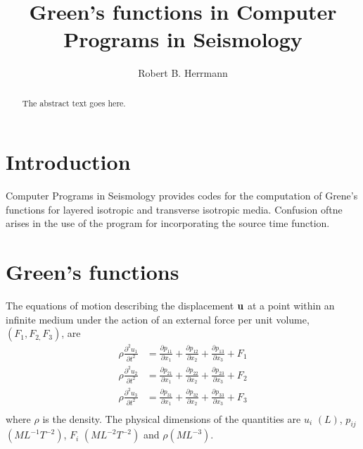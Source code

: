 \documentclass{article}
\begin{document}
\title{Green's functions in Computer Programs in Seismology
{}}
\author{Robert B. Herrmann}

\maketitle

\begin{abstract}

The abstract text goes here.
\end{abstract}

\section{Introduction}

Computer Programs in Seismology provides codes for the computation of Grene's functions for layered isotropic and transverse isotropic media.
Confusion oftne arises in the use of the program for incorporating the source time function.

\section{Green's functions}


The equations of motion describing the displacement $ {\bf u} $ at a point within an infinite medium under the action of
an external force per unit
volume, $( F_1 , F_{2,} F_3 ) $, 
are
\begin{equation} \label{eq5_2_1}
\begin{aligned}
 \rho \frac{ \partial^2 { u_1 }  }{  \partial t^2 } &= 
{ \frac{ \partial { p_{11} }  }{  \partial x_1 } } +
{ \frac{ \partial { p_{12} }  }{  \partial x_2 } }+
{ \frac{ \partial { p_{13} }  }{  \partial x_3 } }+
{ F_1 } \\
 \rho \frac{ \partial^2 { u_2 }  }{  \partial t^2 } &=
{ \frac{ \partial { p_{21} }  }{  \partial x_1 } } +
{ \frac{ \partial { p_{22} }  }{  \partial x_2 } }+
{ \frac{ \partial { p_{23} }  }{  \partial x_3 } }+
{ F_2 } \\
 \rho \frac{ \partial^2 { u_3 }  }{  \partial t^2 } &=
{ \frac{ \partial { p_{31} }  }{  \partial x_1 } } +
{ \frac{ \partial { p_{32} }  }{  \partial x_2 } }+
{ \frac{ \partial { p_{33} }  }{  \partial x_3 } } +
{ F_3 } \\
\end{aligned}
\end{equation}
where $ \rho $ is the density.
The physical dimensions  of the quantities are $ u_i $ $( L)$,
$ p_{ij} $ $( M L^{-1} T^{-2}  ) $, $ F_i $ $( M L^{-2} T^{-2}  ) $ and $ \rho ( M L^{-3} )$.
\end{document}
